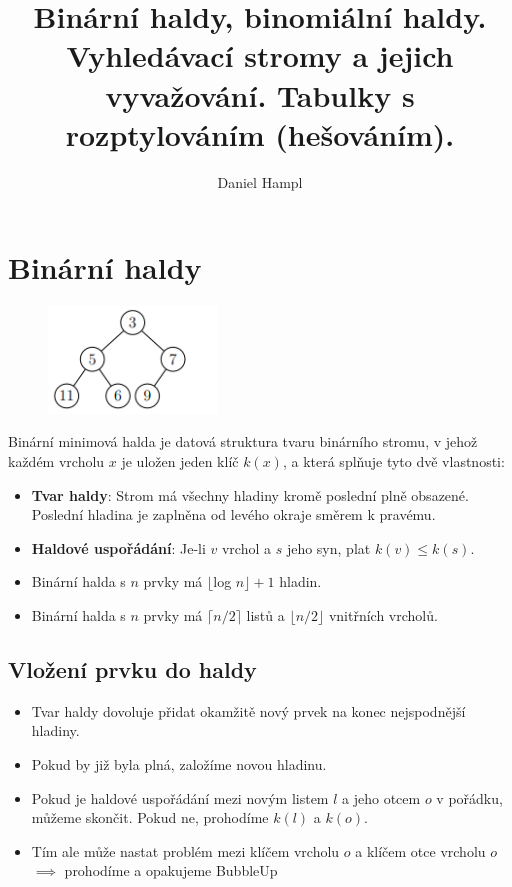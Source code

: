 \documentclass{szzclass}
\title{Binární haldy, binomiální haldy. Vyhledávací stromy a   jejich vyvažování. Tabulky s rozptylováním (hešováním).}
\author{Daniel Hampl}
\begin{document}
\maketitle

\tableofcontents
\newpage

\section{Binární haldy}

\begin{figure}[h]
\centering
\includegraphics[width=0.4\textwidth]{topics/bi-spol-5/images/binary-heap.png}
\end{figure}

Binární minimová halda je datová struktura tvaru binárního
stromu, v jehož každém vrcholu $x$ je uložen jeden klíč $k(x)$, a která
splňuje tyto dvě vlastnosti:
\begin{itemize}
    \item \textbf{Tvar haldy}: Strom má všechny hladiny kromě poslední plně
    obsazené. Poslední hladina je zaplněna od levého okraje směrem k pravému.
    \item \textbf{Haldové uspořádání}: Je-li $v$ vrchol a $s$ jeho syn, plat $k(v) ≤ k(s)$.
    \item Binární halda s $n$ prvky má $\lfloor $log $ n \rfloor + 1$ hladin.
    \item Binární halda s $n$ prvky má $\lceil n/2\rceil$ listů a $\lfloor n/2 \rfloor$ vnitřních vrcholů.
\end{itemize}

\subsection{Vložení prvku do haldy}
\begin{itemize}
    \item Tvar haldy dovoluje přidat okamžitě nový prvek na konec nejspodnější hladiny.
    \item Pokud by již byla plná, založíme novou hladinu.
    \item Pokud je haldové uspořádání mezi novým listem $l$ a jeho otcem $o$ v pořádku, můžeme skončit. Pokud ne, prohodíme $k(l)$ a $k(o)$.
    \item Tím ale může nastat problém mezi klíčem vrcholu $o$ a klíčem otce vrcholu $o$ $\implies$  prohodíme a opakujeme BubbleUp
\end{itemize}
\end{document}
